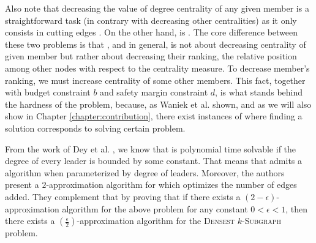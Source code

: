 Also note that decreasing the value of degree centrality of any given member is a straightforward task
(in contrary with decreasing other centralities) as it only consists in cutting edges \cite{Waniek2016}.
On the other hand, \HLdeg is \NPc \cite{Waniek2017}.
The core difference between these two problems is that \HLdeg, and \HLshort in general,
is not about decreasing centrality of given member but rather about decreasing their ranking,
the relative position among other nodes with respect to the centrality measure.
To decrease member's ranking, we must increase centrality of some other members.
This fact, together with budget constraint $b$ and safety margin constraint $d$,
is what stands behind the hardness of the \HL problem, because,
as Waniek et al. \cite{Waniek2017} shown, and as we will also show in Chapter \ref{chapter:contribution},
there exist instances of \HLshort where finding a solution corresponds to solving certain \NPh problem.

From the work of Dey et al. \cite{Dey2019}, we know that \HLdeg is polynomial time solvable
if the degree of every leader is bounded by some constant.
That means that \HLdeg admits a \FPT algorithm when parameterized by degree of leaders.
Moreover, the authors present a $2$-approximation algorithm for \HLdeg which optimizes
the number of edges added.
They complement that by proving that if there exists a $(2-\epsilon)$-approximation algorithm
for the above problem for any constant $0 < \epsilon < 1$, then there exists
a $(\frac{\epsilon}{2})$-approximation algorithm for the \textsc{Densest} $k$-\textsc{Subgraph} problem.
